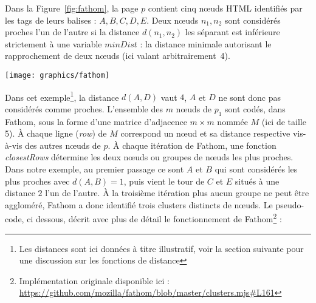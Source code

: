 \documentclass[symmetric,justified,marginals=raggedouter]{tufte-book}
\begin{document}
Dans la Figure~\ref{fig:fathom}, la page $p$ contient cinq nœuds HTML identifiés par les tags de leurs balises : $A, B, C, D, E$. Deux nœuds $n_1, n_2$ sont considérés proches l'un de l'autre si la distance $d(n_1,n_2)$ les séparant est inférieure strictement à une variable $minDist$ : la distance minimale autorisant le rapprochement de deux nœuds (ici valant arbitrairement~4). 

\begin{figure*}%
  \texttt{[image: graphics/fathom]}
  \caption{Processus de classification des nœuds d'une page Web}
  \label{fig:fathom}
\end{figure*}

\noindent Dans cet exemple\footnote{\RaggedOuter Les distances sont ici données à titre illustratif, voir la section suivante pour une discussion sur les fonctions de distance}, la distance $d(A,D)$ vaut $4$, $A$ et $D$ ne sont donc pas considérés comme proches. L'ensemble des $m$ nœuds de $p_1$ sont codés, dans Fathom, sous la forme d'une matrice d'adjacence $m \times m$ nommée $M$ (ici de taille 5). À chaque ligne (\textit{row}) de $M$ correspond un nœud et sa distance respective vis-à-vis des autres nœuds de $p$. À chaque itération de Fathom, une fonction \textit{closestRows} détermine les deux nœuds ou groupes de nœuds les plus proches. Dans notre exemple, au premier passage ce sont $A$ et $B$ qui sont considérés les plus proches avec $d(A,B)=1$, puis vient le tour de $C$ et $E$ situés à une distance $2$ l'un de l'autre. À la troisième itération plus aucun groupe ne peut être aggloméré, Fathom a donc identifié trois clusters distincts de nœuds. Le pseudo-code, ci dessous, décrit avec plus de détail le fonctionnement de Fathom\footnote{\RaggedOuter Implémentation originale disponible ici : \url{https://github.com/mozilla/fathom/blob/master/clusters.mjs\#L161}} :  

\begin{algorithm}
\end{algorithm}
\end{document}

